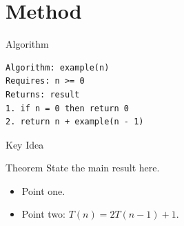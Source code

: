 \section{Method}
\begin{frame}[fragile]{Algorithm}
\begin{lstlisting}
Algorithm: example(n)
Requires: n >= 0
Returns: result
1. if n = 0 then return 0
2. return n + example(n - 1)
\end{lstlisting}
\end{frame}

\begin{frame}{Key Idea}
  \begin{block}{Theorem}
    State the main result here.
  \end{block}
  \begin{itemize}
    \item Point one.
    \item Point two: \(T(n)=2T(n-1)+1\).
  \end{itemize}
\end{frame}
